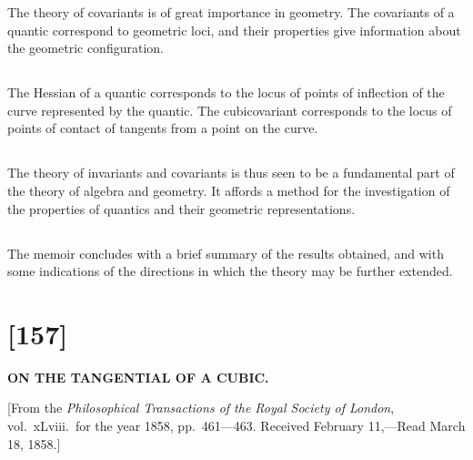 \documentclass[12pt,a4paper]{article}
\begin{document}
The theory of covariants is of great importance in geometry. The covariants of a quantic correspond to geometric loci, and their properties give information about the geometric configuration.

\subsection{}

The Hessian of a quantic corresponds to the locus of points of inflection of the curve represented by the quantic. The cubicovariant corresponds to the locus of points of contact of tangents from a point on the curve.

\subsection{}

The theory of invariants and covariants is thus seen to be a fundamental part of the theory of algebra and geometry. It affords a method for the investigation of the properties of quantics and their geometric representations.

\subsection{}

The memoir concludes with a brief summary of the results obtained, and with some indications of the directions in which the theory may be further extended.



\newpage
\section*{[157]}

\begin{center}
\Large\textbf{ON THE TANGENTIAL OF A CUBIC.}
\end{center}

\begin{center}
\small[From the \textit{Philosophical Transactions of the Royal Society of London}, vol.~xLviii.\ for the year 1858, pp.~461---463. Received February 11,---Read March 18, 1858.]
\end{center}
\end{document}
